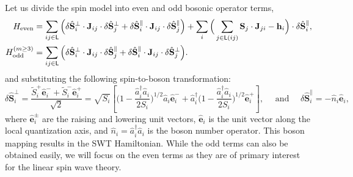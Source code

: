 \documentclass[aps, prx, nofootinbib, superscriptaddress]{revtex4-2}
\begin{document}
Let us divide the spin model into even and odd bosonic operator terms,
\begin{subequations}\label{eq: LSWT boson expansion even/odd}
    \begin{align}
        H_{\rm even} &= \sum_{ij\in\mathsf{L}} 
        \Big( \delta \hat{\mathbf{S}}_{i}^{\perp} \cdot \mathbf{J}_{ij} \cdot \delta \hat{\mathbf{S}}_{j}^{\perp} 
        + \delta \hat{\mathbf{S}}_{i}^{\parallel} \cdot \mathbf{J}_{ij} \cdot \delta \hat{\mathbf{S}}_{j}^{\parallel} \Big)
        + \sum_{i} \Big( \sum_{j \in \mathsf{L}(ij)} \mathbf{S}_{j} \cdot \mathbf{J}_{ji} - \mathbf{h}_{i} \Big) \cdot \delta \hat{\mathbf{S}}_{i}^{\parallel}, 
        \label{subeq: even bosonic terms in SWT} \\
        H_{\rm odd}^{(m \ge 3)} &= \sum_{ij\in\mathsf{L}} 
        \Big( \delta \hat{\mathbf{S}}_{i}^{\perp} \cdot \mathbf{J}_{ij} \cdot \delta \hat{\mathbf{S}}_{j}^{\parallel} 
        + \delta \hat{\mathbf{S}}_{i}^{\parallel} \cdot \mathbf{J}_{ij} \cdot \delta \hat{\mathbf{S}}_{j}^{\perp} \Big).
        \label{subeq: odd bosonic terms in SWT} 
    \end{align}
\end{subequations}
and substituting the following spin-to-boson transformation:
\begin{equation}
    \delta \hat{\mathbf{S}}_{i}^{\perp} = \frac{\widetilde{S}_{i}^{+} \hat{\mathbf{e}}^{-}_{i} + \widetilde{S}_{i}^{-} \hat{\mathbf{e}}^{+}_{i} }{\sqrt{2}} = \sqrt{S_{i}} \left[ \Big( 1 - \frac{\hat{a}^{\dagger}_{i}\hat{a}_{i}}{2S_{i}} \Big)^{1/2} \hat{a}_{i} \hat{\mathbf{e}}_{i}^{-} + \hat{a}_{i}^{\dagger} \Big( 1 - \frac{\hat{a}^{\dagger}_{i}\hat{a}_{i}}{2S_{i}} \Big)^{1/2} \hat{\mathbf{e}}_{i}^{+} \right], 
    \quad \text{ and } \quad
    \delta \hat{\mathbf{S}}^{\parallel}_{i} =  - \hat{n}_{i} \hat{\mathbf{e}}_{i},
\end{equation}
where $\hat{\mathbf{e}}_{i}^{\pm}$ are the raising and lowering unit vectors, $\hat{\mathbf{e}}_{i}$ is the unit vector along the local quantization axis, and $\hat{n}_{i} = \hat{a}^{\dagger}_{i}\hat{a}_{i}$ is the boson number operator.
This boson mapping results in the SWT Hamiltonian. 
While the odd terms can also be obtained easily, we will focus on the even terms as they are of primary interest for the linear spin wave theory.
\end{document}
